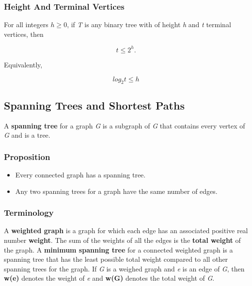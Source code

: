 \documentclass{article}
\begin{document}
\subsubsection{Height And Terminal Vertices}
For all integers $h \geq 0$, if \textit{T} is any binary tree with of height \textit{h} and \textit{t} terminal vertices, then

\begin{equation}
t \leq 2^h.
\end{equation}

Equivalently,

\begin{equation}
log _2 t \leq h
\end{equation}

\subsection{Spanning Trees and Shortest Paths}
A \textbf{spanning tree} for a graph \textit{G} is a subgraph of \textit{G} that contains every vertex of \textit{G} and is a tree.

\subsubsection{Proposition}
\begin{itemize}
\item Every connected graph has a spanning tree.
\item Any two spanning trees for a graph have the same number of edges.
\end{itemize}

\subsubsection{Terminology}
A \textbf{weighted graph} is a graph for which each edge has an associated positive real number \textbf{weight}. The sum of the weights of all the edges is the \textbf{total weight} of the graph. A \textbf{minimum spanning tree} for a connected weighted graph is a spanning tree that has the least possible total weight compared to all other spanning trees for the graph.
If \textit{G} is a weighed graph and \textit{e} is an edge of \textit{G}, then \textbf{w(e)} denotes the weight of \textit{e} and \textbf{w(G)} denotes the total weight of \textit{G}.
\end{document}
